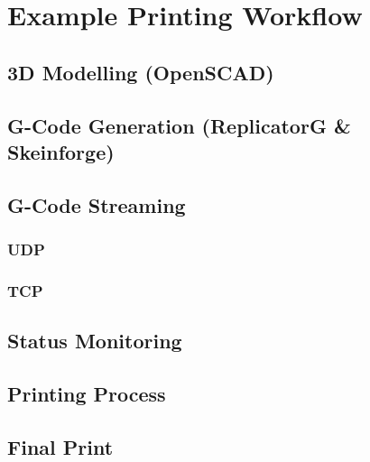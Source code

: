 \chapter{Example Printing Workflow}
	
	\section{3D Modelling (OpenSCAD)}
	
	\section{G-Code Generation (ReplicatorG \& Skeinforge)}
	
	\section{G-Code Streaming}
		
		\subsection{UDP}
		
		\subsection{TCP}
	
	\section{Status Monitoring}
	
	\section{Printing Process}
	
	\section{Final Print}
